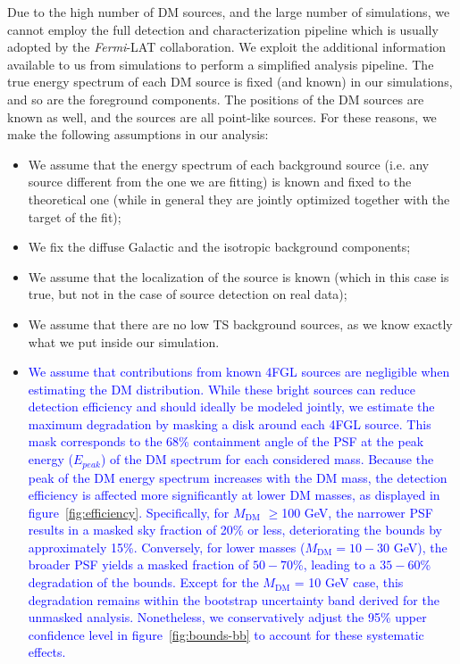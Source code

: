 \documentclass[12pt, a4paper]{article}
\newcommand{\new}[1]{\textcolor{blue}{#1}}
\newcommand{\Fermi}{\textsl{Fermi}}
\newcommand{\mdm}{{M_\textrm{DM}}}
\begin{document}
Due to the high number of DM sources, and the large number of simulations, we cannot employ the full detection and characterization pipeline which is usually adopted by the \Fermi-LAT collaboration.
We exploit the additional information available to us from simulations to perform a simplified analysis pipeline. 
The true energy spectrum of each DM source is fixed (and known) in our simulations, and so are the foreground components. The positions of the DM sources are known as well, and the sources are all point-like sources. For these reasons, we make the following assumptions in our analysis:
\begin{itemize}
    \item We assume that the energy spectrum of each background source (i.e. any source different from the one we are fitting) is known and fixed to the theoretical one (while in general they are jointly optimized together with the target of the fit);
    \item We fix the diffuse Galactic and the isotropic background components;
    \item We assume that the localization of the source is known (which in this case is true, but not in the case of source detection on real data);
    \item We assume that there are no low TS background sources, as we know exactly what we put inside our simulation.
    \item \new{We assume that contributions from known 4FGL sources are negligible when estimating the DM distribution. While these bright sources can reduce detection efficiency and should ideally be modeled jointly, we estimate the maximum degradation by masking a disk around each 4FGL source. 
    This mask corresponds to the 68\% containment angle of the PSF at the peak energy ($E_{peak}$) of the DM spectrum for each considered mass. Because the peak of the DM energy spectrum increases with the DM mass, the detection efficiency is affected more significantly at lower DM masses, as displayed in figure~\ref{fig:efficiency}. Specifically, for $\mdm$ $\geq$100 GeV, the narrower PSF results in a masked sky fraction of 20\% or less, deteriorating the bounds by approximately 15\%. 
    Conversely, for lower masses ($\mdm = 10 - 30$ GeV), the broader PSF yields a masked fraction of $50 - 70$\%, leading to a $35 - 60$\% degradation of the bounds. 
    Except for the $\mdm$ = 10 GeV case, this degradation remains within the bootstrap uncertainty band derived for the unmasked analysis. Nonetheless, we conservatively adjust the 95\% upper confidence level in figure~\ref{fig:bounds-bb} to account for these systematic effects.}
\end{itemize}
\end{document}
